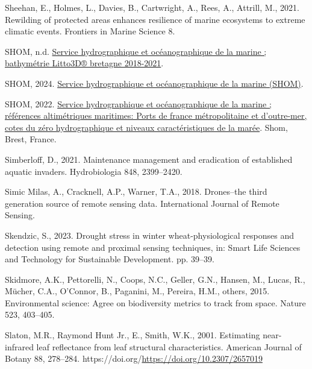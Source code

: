 \documentclass[
  letterpaper,
  11pt,
  english,
  singlespacing,
  headsepline]{MastersDoctoralThesis}
\newlength{\cslhangindent}
\newenvironment{CSLReferences}[2] %
 {\begin{list}{}{%
  \setlength{\itemindent}{0pt}
  \setlength{\leftmargin}{0pt}
  \setlength{\parsep}{0pt}
  \ifodd #1
   \setlength{\leftmargin}{\cslhangindent}
   \setlength{\itemindent}{-1\cslhangindent}
  \fi
  \setlength{\itemsep}{#2\baselineskip}}}
 {\end{list}}
\begin{document}
\begin{CSLReferences}{1}{0}
Sheehan, E., Holmes, L., Davies, B., Cartwright, A., Rees, A., Attrill,
M., 2021. Rewilding of protected areas enhances resilience of marine
ecosystems to extreme climatic events. Frontiers in Marine Science 8.

SHOM, n.d.
\href{https://services.data.shom.fr/geonetwork/srv/fre/catalog.search\#/metadata/BATHYMETRIE_LITTO3D_BZH_2018_2021.xml}{Service
hydrographique et océanographique de la marine ; bathymétrie Litto3D®
bretagne 2018-2021}.

SHOM, 2024. \href{https://www.shom.fr}{Service hydrographique et
océanographique de la marine (SHOM)}.

SHOM, 2022.
\href{https://diffusion.shom.fr/references-altimetriques-maritimes-ram.html}{Service
hydrographique et océanographique de la marine ; références
altimétriques maritimes: Ports de france métropolitaine et d'outre-mer,
cotes du zéro hydrographique et niveaux caractéristiques de la marée}.
Shom, Brest, France.

Simberloff, D., 2021. Maintenance management and eradication of
established aquatic invaders. Hydrobiologia 848, 2399--2420.

Simic Milas, A., Cracknell, A.P., Warner, T.A., 2018. Drones--the third
generation source of remote sensing data. International Journal of
Remote Sensing.

Skendzic, S., 2023. Drought stress in winter wheat-physiological
responses and detection using remote and proximal sensing techniques,
in: Smart Life Sciences and Technology for Sustainable Development. pp.
39--39.

Skidmore, A.K., Pettorelli, N., Coops, N.C., Geller, G.N., Hansen, M.,
Lucas, R., Mücher, C.A., O'Connor, B., Paganini, M., Pereira, H.M.,
others, 2015. Environmental science: Agree on biodiversity metrics to
track from space. Nature 523, 403--405.

Slaton, M.R., Raymond Hunt Jr., E., Smith, W.K., 2001. Estimating
near-infrared leaf reflectance from leaf structural characteristics.
American Journal of Botany 88, 278--284.
https://doi.org/\url{https://doi.org/10.2307/2657019}


\end{CSLReferences}
\end{document}
